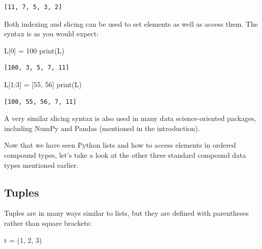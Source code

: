 \documentclass[]{article}
\newenvironment{Shaded}{}{}
\newcommand{\DecValTok}[1]{\textcolor[rgb]{0.25,0.63,0.44}{{#1}}}
\newcommand{\OperatorTok}[1]{\textcolor[rgb]{0.40,0.40,0.40}{{#1}}}
\newcommand{\BuiltInTok}[1]{{#1}}
\newcommand{\NormalTok}[1]{{#1}}
\begin{document}
\begin{verbatim}
[11, 7, 5, 3, 2]
\end{verbatim}

Both indexing and slicing can be used to set elements as well as access
them. The syntax is as you would expect:

\begin{Shaded}
\begin{Highlighting}[]
\NormalTok{L[}\DecValTok{0}\NormalTok{] }\OperatorTok{=} \DecValTok{100}
\BuiltInTok{print}\NormalTok{(L)}
\end{Highlighting}
\end{Shaded}

\begin{verbatim}
[100, 3, 5, 7, 11]
\end{verbatim}

\begin{Shaded}
\begin{Highlighting}[]
\NormalTok{L[}\DecValTok{1}\NormalTok{:}\DecValTok{3}\NormalTok{] }\OperatorTok{=} \NormalTok{[}\DecValTok{55}\NormalTok{, }\DecValTok{56}\NormalTok{]}
\BuiltInTok{print}\NormalTok{(L)}
\end{Highlighting}
\end{Shaded}

\begin{verbatim}
[100, 55, 56, 7, 11]
\end{verbatim}

A very similar slicing syntax is also used in many data science-oriented
packages, including NumPy and Pandas (mentioned in the introduction).

Now that we have seen Python lists and how to access elements in ordered
compound types, let's take a look at the other three standard compound
data types mentioned earlier.

\subsection{Tuples}\label{tuples}

Tuples are in many ways similar to lists, but they are defined with
parentheses rather than square brackets:

\begin{Shaded}
\begin{Highlighting}[]
\NormalTok{t }\OperatorTok{=} \NormalTok{(}\DecValTok{1}\NormalTok{, }\DecValTok{2}\NormalTok{, }\DecValTok{3}\NormalTok{)}
\end{Highlighting}
\end{Shaded}
\end{document}
